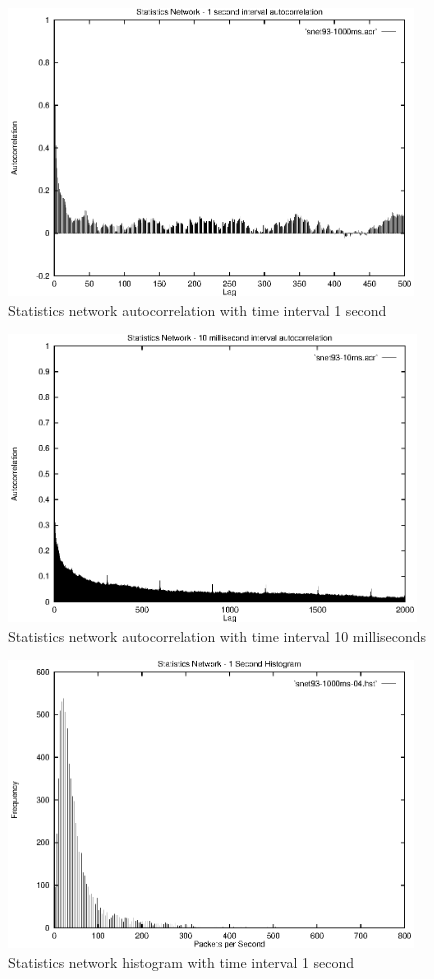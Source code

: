 \begin{figure}
\includegraphics[height=3in]{pics/snet93-1s-acr.eps}
\caption{Statistics network autocorrelation with time interval 1 second}
\label{results:snet93.1s.acr}
\end{figure}

\begin{figure}
\includegraphics[height=3in]{pics/snet93-10ms-acr.eps}
\caption{Statistics network autocorrelation with time interval 10 milliseconds}
\label{results:snet93.10ms.acr}
\end{figure}

\begin{figure}
\includegraphics[height=3in]{pics/snet93-1s-hist-04.eps}
\caption{Statistics network histogram with time interval 1 second}
\label{results:snet93.1s.hist}
\end{figure}

